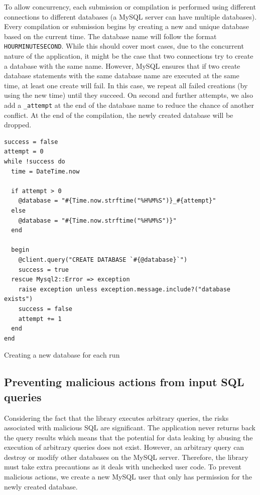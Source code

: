 To allow concurrency, each submission or compilation is performed using different connections to different databases (a MySQL server can have multiple databases). Every compilation or submission begins by creating a new and unique database based on the current time. The database name will follow the format \texttt{HOURMINUTESECOND}. While this should cover most cases, due to the concurrent nature of the application, it might be the case that two connections try to create a database with the same name. However, MySQL ensures that if two create database statements with the same database name are executed at the same time, at least one create will fail. In this case, we repeat all failed creations (by using the new time) until they succeed. On second and further attempts, we also add a \texttt{_attempt} at the end of the database name to reduce the chance of another conflict. At the end of the compilation, the newly created database will be dropped.

\begin{code}
    \begin{verbatim}
success = false
attempt = 0
while !success do
  time = DateTime.now

  if attempt > 0
    @database = "#{Time.now.strftime("%H%M%S")}_#{attempt}"
  else
    @database = "#{Time.now.strftime("%H%M%S")}"
  end

  begin
    @client.query("CREATE DATABASE `#{@database}`")
    success = true
  rescue Mysql2::Error => exception
    raise exception unless exception.message.include?("database exists")
    success = false
    attempt += 1
  end
end
\end{verbatim}
    \caption{Creating a new database for each run}
    \label{fig:creating_new_database}
\end{code}

\subsection{Preventing malicious actions from input SQL queries}

Considering the fact that the library executes arbitrary queries, the risks associated with malicious SQL are significant. The application never returns back the query results which means that the potential for data leaking by abusing the execution of arbitrary queries does not exist. However, an arbitrary query can destroy or modify other databases on the MySQL server. Therefore, the library must take extra precautions as it deals with unchecked user code. To prevent malicious actions, we create a new MySQL user that only has permission for the newly created database.

